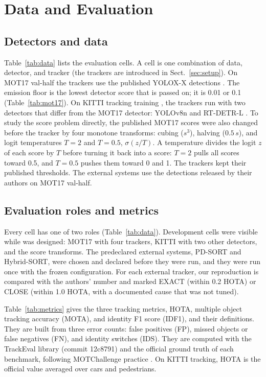 \section{Data and Evaluation}\label{sec:data-eval}

\subsection{Detectors and data}\label{sec:data}
Table~\ref{tab:data} lists the evaluation cells. A cell is one combination of
data, detector, and tracker (the trackers are introduced in
Sect.~\ref{sec:setup}). On MOT17 val-half \cite{milan2016mot16} the trackers
use the published YOLOX-X detections \cite{ge2021yolox}. The emission floor is
the lowest detector score that is passed on; it is 0.01 or 0.1
(Table~\ref{tab:mot17}). On KITTI tracking training \cite{geiger2012kitti},
the trackers run with two detectors that differ from the MOT17 detector:
YOLOv8n \cite{jocher2023yolov8} and RT-DETR-L \cite{zhao2024rtdetr}. To study
the score problem directly, the published MOT17 scores were also changed
before the tracker by four monotone transforms: cubing ($s^3$), halving ($0.5\,s$),
and logit temperatures $T=2$ and $T=0.5$, $\sigma(z/T)$. A temperature
divides the logit $z$ of each score by $T$ before turning it back into a
score: $T=2$ pulls all scores toward 0.5, and $T=0.5$ pushes them toward 0
and 1. The trackers kept their published thresholds. The external systems use the detections released
by their authors on MOT17 val-half.



\subsection{Evaluation roles and metrics}\label{sec:roles}
Every cell has one of two roles (Table~\ref{tab:data}). Development cells
were visible while \scl{} was designed: MOT17 with four trackers, KITTI with
two other detectors, and the score transforms. The predeclared external systems,
PD-SORT and Hybrid-SORT, were chosen and declared before they were run, and
they were run once with the frozen configuration. For each external tracker,
our reproduction is compared with the authors' number and marked EXACT
(within 0.2 HOTA) or CLOSE (within 1.0 HOTA, with a documented cause that was
not tuned).

\label{sec:metrics}Table~\ref{tab:metrics} gives the three tracking metrics,
HOTA, multiple object tracking accuracy (MOTA), and identity F1 score (IDF1),
and their definitions. They are built from three error counts: false
positives (FP), missed objects or false negatives (FN), and identity switches
(IDS). They are computed with the TrackEval library (commit
12c8791) and the official ground truth of each benchmark, following
MOTChallenge practice \cite{dendorfer2021motchallenge}. On KITTI tracking,
HOTA is the official value averaged over cars and pedestrians.

